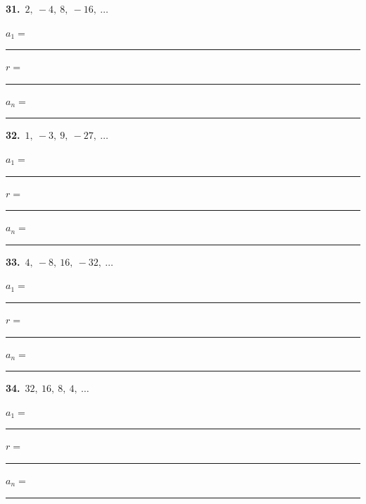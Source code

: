 \documentclass[11pt,letterpaper]{article}
\begin{document}
\needspace{2.0cm}\par\vspace{3mm}\noindent\begin{minipage}[t]{0.48\linewidth}{\color{fmturn}\bfseries 31.}\ $2,\ -4,\ 8,\ -16,\ \ldots$\par\vspace{2mm}\hspace*{4mm}$a_1=$\,\rule{1.2cm}{0.4pt}\quad $r=$\,\rule{1.2cm}{0.4pt}\par\vspace{2.5mm}\hspace*{4mm}$a_n=$\,\rule{3.6cm}{0.4pt}\end{minipage}\hfill\begin{minipage}[t]{0.48\linewidth}{\color{fmturn}\bfseries 32.}\ $1,\ -3,\ 9,\ -27,\ \ldots$\par\vspace{2mm}\hspace*{4mm}$a_1=$\,\rule{1.2cm}{0.4pt}\quad $r=$\,\rule{1.2cm}{0.4pt}\par\vspace{2.5mm}\hspace*{4mm}$a_n=$\,\rule{3.6cm}{0.4pt}\end{minipage}\par\vspace{1.0cm}
\needspace{2.0cm}\par\vspace{3mm}\noindent\begin{minipage}[t]{0.48\linewidth}{\color{fmturn}\bfseries 33.}\ $4,\ -8,\ 16,\ -32,\ \ldots$\par\vspace{2mm}\hspace*{4mm}$a_1=$\,\rule{1.2cm}{0.4pt}\quad $r=$\,\rule{1.2cm}{0.4pt}\par\vspace{2.5mm}\hspace*{4mm}$a_n=$\,\rule{3.6cm}{0.4pt}\end{minipage}\hfill\begin{minipage}[t]{0.48\linewidth}{\color{fmturn}\bfseries 34.}\ $32,\ 16,\ 8,\ 4,\ \ldots$\par\vspace{2mm}\hspace*{4mm}$a_1=$\,\rule{1.2cm}{0.4pt}\quad $r=$\,\rule{1.2cm}{0.4pt}\par\vspace{2.5mm}\hspace*{4mm}$a_n=$\,\rule{3.6cm}{0.4pt}\end{minipage}\par\vspace{1.0cm}
\end{document}
